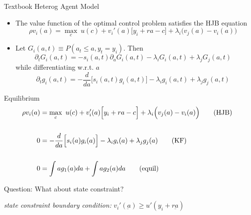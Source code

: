 \documentclass[10pt]{beamer} %
\theoremstyle{plain}
\theoremstyle{definition}
\theoremstyle{remark}
\begin{document}
\begin{frame}{Textbook Heterog Agent Model}{} 
\begin{itemize}
    \item The value function of the optimal control problem satisfies the HJB equation 
    \begin{equation*}
        \rho v_i( a )  = \max_c\ u(c) +v_i'(a) \Big[ y_i + ra - c \Big] + \lambda_i \Big(v_j( a ) - v_i( a) \Big) 
    \end{equation*} \medskip

    \item Let $G_i(a,t) \equiv P( a_t \le a, y_t = y_i )$. Then
    \begin{equation*}
        \partial_t G_i( a,t ) = -s_i( a,t ) \partial_a G_i( a,t ) - \lambda_i G_i( a,t ) + \lambda_j G_j( a,t )
    \end{equation*}
    while differentiating w.r.t. $a$
    \begin{equation*}
        \partial_t g_i(a,t) = - \frac{d}{da}\big[  s_i( a,t ) g_i( a,t ) \big] - \lambda_i g_i( a,t ) + \lambda_j g_j( a,t )
    \end{equation*}
    

\end{itemize}
\end{frame}
\begin{frame}{Equilibrium}{}  
\begin{align}
    \rho v_i (a) & = \max_c \  u(c) +v_i'(a) \Big[ y_i + ra - c \Big] + \lambda_i \Big(v_j( a ) - v_i( a) \Big) \tag{HJB} \\ 
    \notag \\
    0            & = - \frac{d}{da}\Big[ s_i(a) g_i(a) \Big] - \lambda_i g_i( a ) + \lambda_j g_j( a )  \tag{KF} \\ \
    \notag \\
    0            & = \int a g_1(a) da + \int a g_2( a )da  \tag{equil}
\end{align} \medskip

\alert{Question:} What about state constraint? \medskip

\scriptsize
\emph{state constraint boundary condition: }$v_i'( \underbar{a} ) \ge u'( y_i + r \underbar{a})$

\end{frame}
\end{document}
